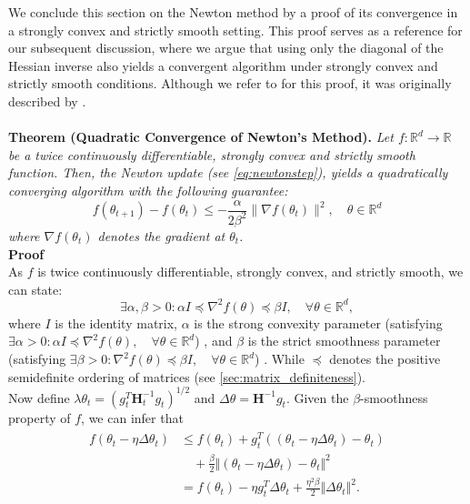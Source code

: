 We conclude this section on the Newton method by a proof of its convergence in a strongly convex and strictly smooth setting.
This proof serves as a reference for our subsequent discussion, where we argue that using only the diagonal of the Hessian inverse also yields
a convergent algorithm under strongly convex and strictly smooth conditions. Although  we refer to \cite{yao2021adahessian} for this proof,
it was originally described by \cite{boyd2004convex}.
\\\\
\noindent\textbf{Theorem (Quadratic Convergence of Newton's Method).} 
\textit{Let $f: \mathbb{R}^d \to \mathbb{R}$ be a twice continuously differentiable, strongly convex and strictly smooth function.
Then, the Newton update (see \ref{eq:newtonstep}),
yields a quadratically converging algorithm with the following guarantee:
\[ f(\theta_{t+1}) - f(\theta_t) \leq - \frac{\alpha}{2\beta^{2}} \|\nabla f(\theta_t)\|^2, \quad \theta  \in \mathbb{R}^d\]
where  $\nabla f(\theta_t)$ denotes the gradient at $\theta_t$.}
\vspace{1em}
\noindent\\\textbf{Proof}\\
As $f$ is twice continuously differentiable, strongly convex, and strictly smooth, we can state:
\begin{equation}
\label{eq:convex_smooth}
\exists \alpha, \beta > 0 : \alpha I \preceq \nabla^2 f(\theta) \preceq \beta I, \quad \forall \theta \in \mathbb{R}^d,
\end{equation}
where $I$ is the identity matrix, $\alpha$ is the strong convexity parameter
(satisfying $\exists \alpha > 0 : \alpha I \preceq \nabla^2 f(\theta), \quad \forall \theta \in \mathbb{R}^d$) \cite{convexity_smoothness},
and $\beta$ is the strict smoothness parameter (satisfying $\exists \beta > 0 : \nabla^2 f(\theta) \preceq \beta I, \quad \forall \theta \in \mathbb{R}^d$) \cite{convexity_smoothness}.
While $\preceq$ denotes the positive semidefinite ordering of matrices (see \ref{sec:matrix_definiteness}).\\
Now define $\lambda\theta_t = \left( g_t^T \mathbf{H}_t^{-1} g_t \right)^{1/2}$ and $
\Delta \theta = \mathbf{H}^{-1}g_t$.
Given the $\beta$-smoothness property of $f$, we can infer that 
\begin{align}
    \begin{split}
        f(\theta_t - \eta\Delta \theta_t) &\leq f(\theta_t) + g_t^T ((\theta_t - \eta\Delta \theta_t) - \theta_t) \\
        &\quad + \frac{\beta}{2} \Vert (\theta_t - \eta\Delta \theta_t) - \theta_t \Vert ^2\\
        &= f(\theta_t) - \eta g_t^T \Delta \theta_t + \frac{\eta^2\beta}{2} \Vert \Delta \theta_t \Vert ^2.
    \end{split}
\end{align}
